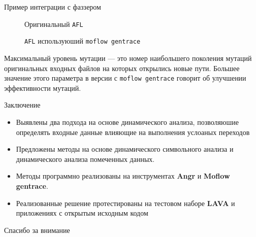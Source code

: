 \documentclass[10pt]{beamer}
\begin{document}
\begin{frame}{Пример интеграции с фаззером}
\begin{figure}[H]
    \caption{\tiny{Оригинальный \texttt{AFL}}}
\end{figure}
\begin{figure}[H]
      \caption{\tiny{\texttt{AFL} используюший \texttt{moflow gentrace}}}
\end{figure}
  \small{Максимальный уровень мутации --- это номер наибольшего поколения мутаций оригинальных входных файлов на которых открылись новые пути. Большее значение этого параметра в версии с \texttt{moflow gentrace} говорит об улучшении эффективности мутаций}.
\end{frame}

\begin{frame}{Заключение}

\begin{itemize}
\item Выявлены два подхода на основе динамического анализа, позволяюшие определять входные данные влияющие на выполнения услоаных переходов
\item Предложены методы на основе динамического символьного анализа и динамического анализа помеченных данных.
\item Методы программно реализованы на инструментах \textbf{Angr} и \textbf{Moflow gentrace}.
\item Реализованные решение протестированы на тестовом наборе \textbf{LAVA} и приложениях с открытым исходным кодом
\end{itemize}


\end{frame}

\begin{frame}[standout] \vfill Спасибо за внимание \vfill \end{frame}

\end{document}
